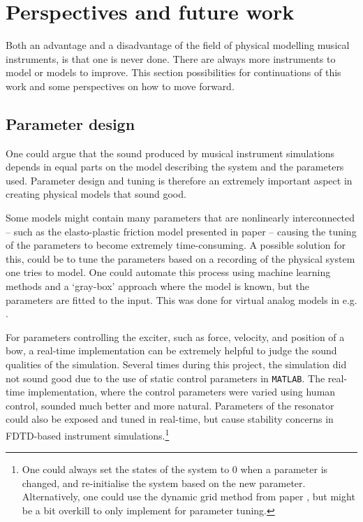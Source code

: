 

\section{Perspectives and future work}
Both an advantage and a disadvantage of the field of physical modelling musical instruments, is that one is never done. There are always more instruments to model or models to improve. This section possibilities for continuations of this work and some perspectives on how to move forward.

\subsection{Parameter design}\label{sec:parameterDesign}
One could argue that the sound produced by musical instrument simulations depends in equal parts on the model describing the system and the parameters used. Parameter design and tuning is therefore an extremely important aspect in creating physical models that sound good. 

Some models might contain many parameters that are nonlinearly interconnected -- such as the elasto-plastic friction model presented in paper \citeP[C] -- causing the tuning of the parameters to become extremely time-consuming. A possible solution for this, could be to tune the parameters based on a recording of the physical system one tries to model. 
One could automate this process using machine learning methods and a `gray-box' approach where the model is known, but the parameters are fitted to the input. This was done for virtual analog models in e.g. \cite{Eichas2017, Parker2019}. 

For parameters controlling the exciter, such as force, velocity, and position of a bow, a real-time implementation can be extremely helpful to judge the sound qualities of the simulation. Several times during this project, the simulation did not sound good due to the use of static control parameters in \texttt{MATLAB}. The real-time implementation, where the control parameters were varied using human control, sounded much better and more natural. Parameters of the resonator could also be exposed and tuned in real-time, but cause stability concerns in FDTD-based instrument simulations.\footnote{One could always set the states of the system to 0 when a parameter is changed, and re-initialise the system based on the new parameter. Alternatively, one could use the dynamic grid method from paper \citeP[G], but might be a bit overkill to only implement for parameter tuning.}

